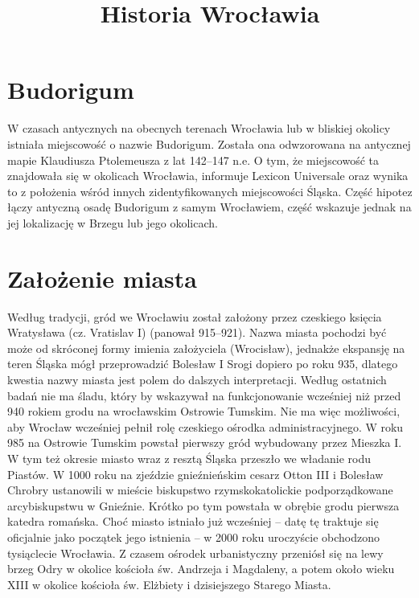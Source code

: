 \documentclass{article}
\title{Historia Wrocławia }
\begin{document}
\maketitle
\tableofcontents

\section{Budorigum}

W czasach antycznych na obecnych terenach Wrocławia lub w bliskiej okolicy istniała miejscowość o nazwie Budorigum. Została ona odwzorowana na antycznej mapie Klaudiusza Ptolemeusza z lat 142–147 n.e. O tym, że miejscowość ta znajdowała się w okolicach Wrocławia, informuje Lexicon Universale oraz wynika to z położenia wśród innych zidentyfikowanych miejscowości Śląska. Część hipotez łączy antyczną osadę Budorigum z samym Wrocławiem, część wskazuje jednak na jej lokalizację w Brzegu lub jego okolicach.

\section{Założenie miasta}

Według tradycji, gród we Wrocławiu został założony przez czeskiego księcia Wratysława (cz. Vratislav I) (panował 915–921). Nazwa miasta pochodzi być może od skróconej formy imienia założyciela (Wrocisław), jednakże ekspansję na teren Śląska mógł przeprowadzić Bolesław I Srogi dopiero po roku 935, dlatego kwestia nazwy miasta jest polem do dalszych interpretacji. Według ostatnich badań nie ma śladu, który by wskazywał na funkcjonowanie wcześniej niż przed 940 rokiem grodu na wrocławskim Ostrowie Tumskim. Nie ma więc możliwości, aby Wrocław wcześniej pełnił rolę czeskiego ośrodka administracyjnego. W roku 985 na Ostrowie Tumskim powstał pierwszy gród wybudowany przez Mieszka I. W tym też okresie miasto wraz z resztą Śląska przeszło we władanie rodu Piastów.
\bigskip
\newline
W 1000 roku na zjeździe gnieźnieńskim cesarz Otton III i Bolesław Chrobry ustanowili w mieście biskupstwo rzymskokatolickie podporządkowane arcybiskupstwu w Gnieźnie. Krótko po tym powstała w obrębie grodu pierwsza katedra romańska. Choć miasto istniało już wcześniej – datę tę traktuje się oficjalnie jako początek jego istnienia – w 2000 roku uroczyście obchodzono tysiąclecie Wrocławia. Z czasem ośrodek urbanistyczny przeniósł się na lewy brzeg Odry w okolice kościoła św. Andrzeja i Magdaleny, a potem około wieku XIII w okolice kościoła św. Elżbiety i dzisiejszego Starego Miasta.
\end{document}
